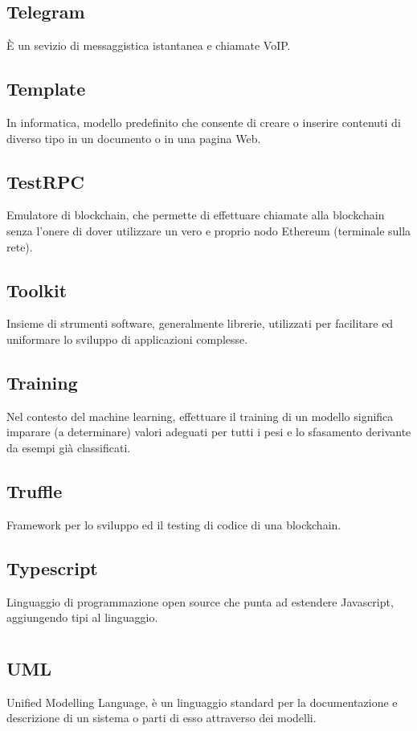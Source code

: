 	\subsection*{Telegram}
	È un sevizio di messaggistica istantanea e chiamate VoIP.
	\subsection*{Template}
	In informatica, modello predefinito che consente di creare o inserire contenuti di diverso tipo in un documento o in una pagina Web.
	\subsection*{TestRPC}
	Emulatore di blockchain, che permette di effettuare chiamate alla blockchain senza l'onere di dover utilizzare un vero e proprio nodo Ethereum (terminale sulla rete).
	\subsection*{Toolkit}
	Insieme di strumenti software, generalmente librerie, utilizzati per facilitare ed uniformare lo sviluppo di applicazioni complesse.
	\subsection*{Training}
	Nel contesto del machine learning, effettuare il training di un modello significa imparare (a determinare) valori adeguati per tutti i pesi e lo sfasamento derivante da esempi già classificati.
	\subsection*{Truffle}
	Framework per lo sviluppo ed il testing di codice di una blockchain. 
	\subsection*{Typescript}
	Linguaggio di programmazione open source che punta ad estendere Javascript, aggiungendo tipi al linguaggio.
\pagebreak
\section[U]{}
	\subsection*{UML}
	Unified Modelling Language, è un linguaggio  standard per la documentazione e descrizione di un sistema o parti di esso attraverso dei modelli.
